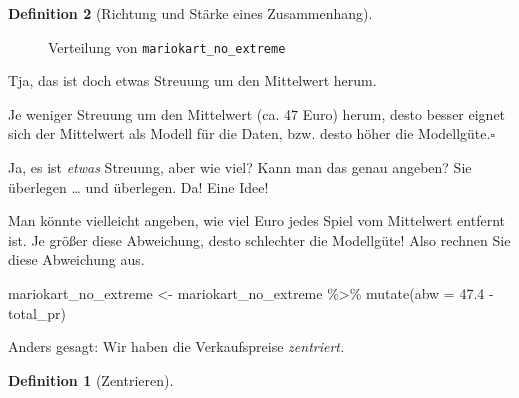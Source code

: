 \documentclass[
  a4paper,
  DIV=11]{scrreprt}
\newenvironment{Shaded}{\begin{snugshade}}{\end{snugshade}}
\newcommand{\AttributeTok}[1]{\textcolor[rgb]{0.40,0.45,0.13}{#1}}
\newcommand{\FloatTok}[1]{\textcolor[rgb]{0.68,0.00,0.00}{#1}}
\newcommand{\FunctionTok}[1]{\textcolor[rgb]{0.28,0.35,0.67}{#1}}
\newcommand{\NormalTok}[1]{\textcolor[rgb]{0.00,0.23,0.31}{#1}}
\newcommand{\OtherTok}[1]{\textcolor[rgb]{0.00,0.23,0.31}{#1}}
\newcommand{\SpecialCharTok}[1]{\textcolor[rgb]{0.37,0.37,0.37}{#1}}
\theoremstyle{definition}
\theoremstyle{definition}
\theoremstyle{definition}
\newtheorem{definition}{Definition}[chapter]
\theoremstyle{remark}
\begin{document}
\begin{definition}[Richtung und Stärke eines
Zusammenhang]
\begin{figure}
\begin{minipage}{0.50\linewidth}
{}


\end{minipage}%

\caption{\label{fig-mariokart_no_extreme}Verteilung von
\texttt{mariokart\_no\_extreme}}

\end{figure}%

Tja, das ist doch etwas Streuung um den Mittelwert herum.

\begin{tcolorbox}[enhanced jigsaw, leftrule=.75mm, opacitybacktitle=0.6, colback=white, colframe=quarto-callout-important-color-frame, coltitle=black, colbacktitle=quarto-callout-important-color!10!white, opacityback=0, left=2mm, breakable, titlerule=0mm, toptitle=1mm, bottomtitle=1mm, rightrule=.15mm, title=\textcolor{quarto-callout-important-color}{\faExclamation}\hspace{0.5em}{Wichtig}, arc=.35mm, bottomrule=.15mm, toprule=.15mm]

Je weniger Streuung um den Mittelwert (ca. 47 Euro) herum, desto besser
eignet sich der Mittelwert als Modell für die Daten, bzw. desto höher
die Modellgüte.\(\square\)

\end{tcolorbox}

Ja, es ist \emph{etwas} Streuung, aber wie viel? Kann man das genau
angeben? Sie überlegen \ldots{} und überlegen. Da! Eine Idee!

Man könnte vielleicht angeben, wie viel Euro jedes Spiel vom Mittelwert
entfernt ist. Je größer diese Abweichung, desto schlechter die
Modellgüte! Also rechnen Sie diese Abweichung aus.

\begin{Shaded}
\begin{Highlighting}[]
\NormalTok{mariokart\_no\_extreme }\OtherTok{\textless{}{-}}
\NormalTok{  mariokart\_no\_extreme }\SpecialCharTok{\%\textgreater{}\%} 
  \FunctionTok{mutate}\NormalTok{(}\AttributeTok{abw =} \FloatTok{47.4} \SpecialCharTok{{-}}\NormalTok{ total\_pr)}
\end{Highlighting}
\end{Shaded}

Anders gesagt: Wir haben die Verkaufspreise \emph{zentriert.}

\begin{definition}[Zentrieren]\protect\hypertarget{def-zentrieren}{}\label{def-zentrieren}


\end{definition}
\end{definition}
\end{document}
